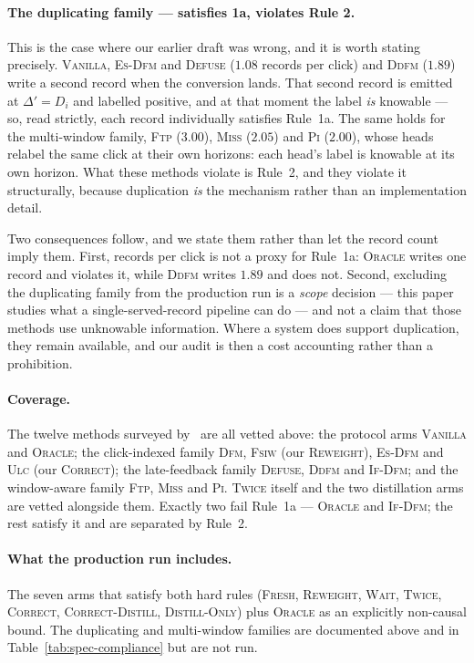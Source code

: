 \paragraph{The duplicating family --- satisfies 1a, violates Rule 2.} This is the case where our
earlier draft was wrong, and it is worth stating precisely. \textsc{Vanilla}, \textsc{Es-Dfm} and
\textsc{Defuse} ($1.08$ records per click) and \textsc{Ddfm} ($1.89$) write a second record when
the conversion lands. That second record is emitted at $\Delta'=D_i$ and labelled positive, and at
that moment the label \emph{is} knowable --- so, read strictly, each record individually satisfies
Rule~1a. The same holds for the multi-window family, \textsc{Ftp} ($3.00$), \textsc{Miss} ($2.05$)
and \textsc{Pi} ($2.00$), whose heads relabel the same click at their own horizons: each head's
label is knowable at its own horizon. What these methods violate is Rule~2, and they violate it
structurally, because duplication \emph{is} the mechanism rather than an implementation detail.

Two consequences follow, and we state them rather than let the record count imply them. First,
records per click is not a proxy for Rule~1a: \textsc{Oracle} writes one record and violates it,
while \textsc{Ddfm} writes $1.89$ and does not. Second, excluding the duplicating family from the
production run is a \emph{scope} decision --- this paper studies what a single-served-record
pipeline can do --- and not a claim that those methods use unknowable information. Where a system
does support duplication, they remain available, and our audit is then a cost accounting rather
than a prohibition.

\paragraph{Coverage.} The twelve methods surveyed by~\cite{li2026twice} are all vetted above:
the protocol arms \textsc{Vanilla} and \textsc{Oracle}; the click-indexed family \textsc{Dfm},
\textsc{Fsiw} (our \textsc{Reweight}), \textsc{Es-Dfm} and \textsc{Ulc} (our \textsc{Correct});
the late-feedback family \textsc{Defuse}, \textsc{Ddfm} and \textsc{If-Dfm}; and the window-aware
family \textsc{Ftp}, \textsc{Miss} and \textsc{Pi}. \textsc{Twice} itself and the two distillation
arms are vetted alongside them. Exactly two fail Rule~1a --- \textsc{Oracle} and \textsc{If-Dfm};
the rest satisfy it and are separated by Rule~2.

\paragraph{What the production run includes.} The seven arms that satisfy both hard rules
(\textsc{Fresh}, \textsc{Reweight}, \textsc{Wait}, \textsc{Twice}, \textsc{Correct},
\textsc{Correct-Distill}, \textsc{Distill-Only}) plus \textsc{Oracle} as an explicitly non-causal
bound. The duplicating and multi-window families are documented above and in
Table~\ref{tab:spec-compliance} but are not run.

